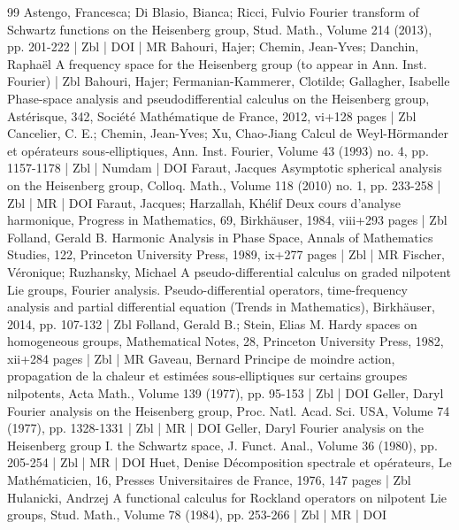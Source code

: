 \begin{thebibliography}{99}
Astengo, Francesca; Di Blasio, Bianca; Ricci, Fulvio Fourier transform of Schwartz functions on the Heisenberg group, Stud. Math., Volume 214 (2013), pp. 201-222 | Zbl | DOI | MR
Bahouri, Hajer; Chemin, Jean-Yves; Danchin, Raphaël A frequency space for the Heisenberg group (to appear in Ann. Inst. Fourier) | Zbl
Bahouri, Hajer; Fermanian-Kammerer, Clotilde; Gallagher, Isabelle Phase-space analysis and pseudodifferential calculus on the Heisenberg group, Astérisque, 342, Société Mathématique de France, 2012, vi+128 pages | Zbl
Cancelier, C. E.; Chemin, Jean-Yves; Xu, Chao-Jiang Calcul de Weyl-Hörmander et opérateurs sous-elliptiques, Ann. Inst. Fourier, Volume 43 (1993) no. 4, pp. 1157-1178 | Zbl | Numdam | DOI
Faraut, Jacques Asymptotic spherical analysis on the Heisenberg group, Colloq. Math., Volume 118 (2010) no. 1, pp. 233-258 | Zbl | MR | DOI
Faraut, Jacques; Harzallah, Khélif Deux cours d’analyse harmonique, Progress in Mathematics, 69, Birkhäuser, 1984, viii+293 pages | Zbl
Folland, Gerald B. Harmonic Analysis in Phase Space, Annals of Mathematics Studies, 122, Princeton University Press, 1989, ix+277 pages | Zbl | MR
Fischer, Véronique; Ruzhansky, Michael A pseudo-differential calculus on graded nilpotent Lie groups, Fourier analysis. Pseudo-differential operators, time-frequency analysis and partial differential equation (Trends in Mathematics), Birkhäuser, 2014, pp. 107-132 | Zbl
Folland, Gerald B.; Stein, Elias M. Hardy spaces on homogeneous groups, Mathematical Notes, 28, Princeton University Press, 1982, xii+284 pages | Zbl | MR
Gaveau, Bernard Principe de moindre action, propagation de la chaleur et estimées sous-elliptiques sur certains groupes nilpotents, Acta Math., Volume 139 (1977), pp. 95-153 | Zbl | DOI
Geller, Daryl Fourier analysis on the Heisenberg group, Proc. Natl. Acad. Sci. USA, Volume 74 (1977), pp. 1328-1331 | Zbl | MR | DOI
Geller, Daryl Fourier analysis on the Heisenberg group I. the Schwartz space, J. Funct. Anal., Volume 36 (1980), pp. 205-254 | Zbl | MR | DOI
Huet, Denise Décomposition spectrale et opérateurs, Le Mathématicien, 16, Presses Universitaires de France, 1976, 147 pages | Zbl
Hulanicki, Andrzej A functional calculus for Rockland operators on nilpotent Lie groups, Stud. Math., Volume 78 (1984), pp. 253-266 | Zbl | MR | DOI

\end{thebibliography}
